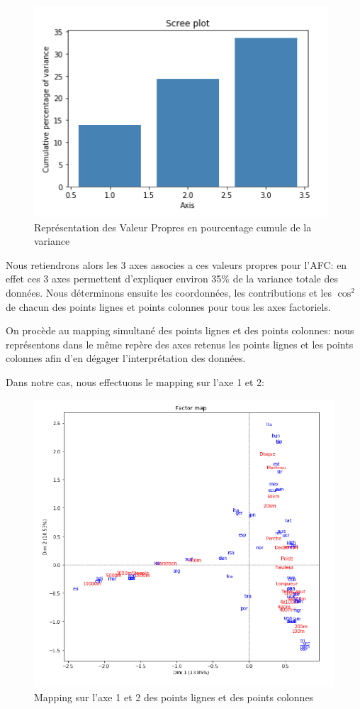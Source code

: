 \documentclass{article}
\begin{document}
\begin{figure}[h!]
\centering
\includegraphics[scale=0.75]{images/VP_cumule.PNG}
\caption{Représentation des Valeur Propres en pourcentage cumule de la variance}
\end{figure}

Nous retiendrons alors les 3 axes associes a ces valeurs propres pour l'AFC: en effet ces 3 axes permettent d'expliquer environ 35\% de la variance totale des données. Nous déterminons ensuite les coordonnées, les contributions et les $\cos^2$ de chacun des points lignes et points colonnes pour tous les axes factoriels.
\newline

On procède au mapping simultané des points lignes et des points colonnes: nous représentons dans le même repère des axes retenus les points lignes et les points colonnes afin d'en dégager l'interprétation des données.

\newpage

Dans notre cas, nous effectuons le mapping sur l'axe 1 et 2:

\begin{figure}[h!]
\centering
\includegraphics[scale=0.8]{images/Mapping.PNG}
\caption{Mapping sur l'axe 1 et 2 des points lignes et des points colonnes}
\end{figure}
\end{document}
